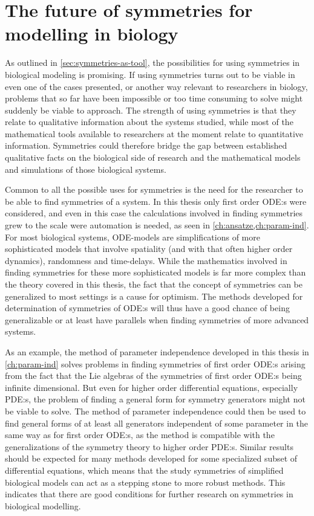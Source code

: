\section{The future of symmetries for modelling in biology} \label{sec:future}

As outlined in \cref{sec:symmetries-as-tool}, the possibilities for using symmetries in biological modeling is promising.
If using symmetries turns out to be viable in even one of the cases presented, or another way relevant to researchers in biology, problems that so far have been impossible or too time consuming to solve might suddenly be viable to approach.
The strength of using symmetries is that they relate to qualitative information about the systems studied, while most of the mathematical tools available to researchers at the moment relate to quantitative information.
Symmetries could therefore bridge the gap between established qualitative facts on the biological side of research and the mathematical models and simulations of those biological systems.

Common to all the possible uses for symmetries is the need for the researcher to be able to find symmetries of a system.
In this thesis only first order ODE:s were considered, and even in this case the calculations involved in finding symmetries grew to the scale were automation is needed, as seen in \cref{ch:ansatze,ch:param-ind}.
For most biological systems, ODE-models are simplifications of more sophisticated models that involve spatiality (and with that often higher order dynamics), randomness and time-delays.
While the mathematics involved in finding symmetries for these more sophisticated models is far more complex than the theory covered in this thesis, the fact that the concept of symmetries can be generalized to most settings is a cause for optimism.
The methods developed for determination of symmetries of ODE:s will thus have a good chance of being generalizable or at least have parallels when finding symmetries of more advanced systems.

As an example, the method of parameter independence developed in this thesis in \cref{ch:param-ind} solves problems in finding symmetries of first order ODE:s arising from the fact that the Lie algebras of the symmetries of first order ODE:s being infinite dimensional.
But even for higher order differential equations, especially PDE:s, the problem of finding a general form for symmetry generators might not be viable to solve.
The method of parameter independence could then be used to find general forms of at least all generators independent of some parameter in the same way as for first order ODE:s, as the method is compatible with the generalizations of the symmetry theory to higher order PDE:s.
Similar results should be expected for many methods developed for some specialized subset of differential equations, which means that the study symmetries of simplified biological models can act as a stepping stone to more robust methods.
This indicates that there are good conditions for further research on symmetries in biological modelling.
